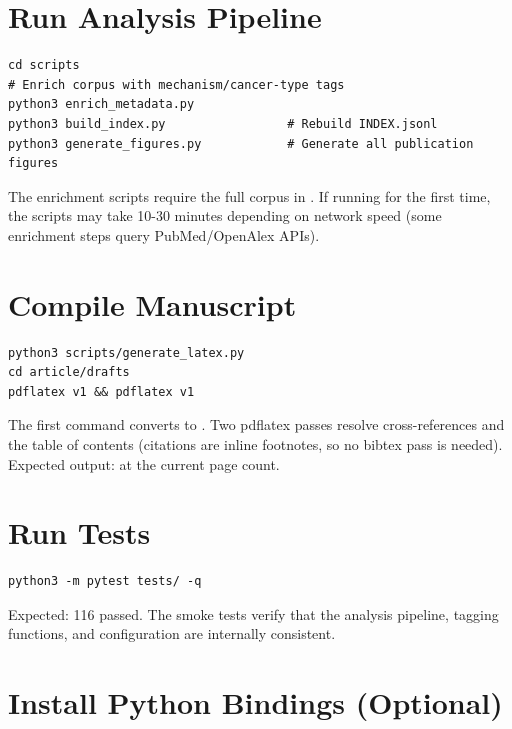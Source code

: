 \documentclass[11pt,twoside,openright]{report}
\begin{document}
\section{Run Analysis Pipeline}

\begin{bookterminal}
\begin{verbatim}
cd scripts
# Enrich corpus with mechanism/cancer-type tags
python3 enrich_metadata.py
python3 build_index.py                 # Rebuild INDEX.jsonl
python3 generate_figures.py            # Generate all publication figures
\end{verbatim}
\end{bookterminal}

The enrichment scripts require the full corpus in . If running for the first time, the scripts may take 10-30 minutes depending on network speed (some enrichment steps query PubMed/OpenAlex APIs).

\section{Compile Manuscript}

\begin{bookterminal}
\begin{verbatim}
python3 scripts/generate_latex.py
cd article/drafts
pdflatex v1 && pdflatex v1
\end{verbatim}
\end{bookterminal}

The first command converts  to . Two pdflatex passes resolve cross-references and the table of contents (citations are inline footnotes, so no bibtex pass is needed). Expected output:  at the current page count.

\section{Run Tests}

\begin{bookterminal}
\begin{verbatim}
python3 -m pytest tests/ -q
\end{verbatim}
\end{bookterminal}

Expected: 116 passed. The smoke tests verify that the analysis pipeline, tagging functions, and configuration are internally consistent.

\section{Install Python Bindings (Optional)}
\end{document}

